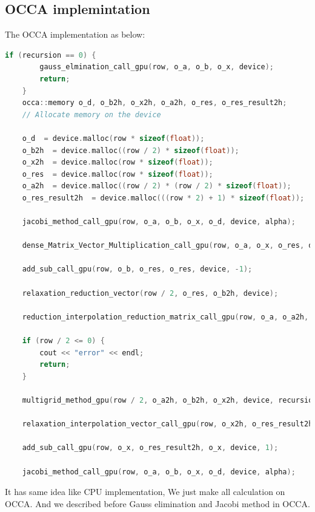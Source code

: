 \subsection{OCCA implemintation}
The OCCA implementation as below:\\
\begin{lstlisting}[language=C, caption=multigrid method in OCCA]
	if (recursion == 0) {
        gauss_elmination_call_gpu(row, o_a, o_b, o_x, device);
        return;
    }
    occa::memory o_d, o_b2h, o_x2h, o_a2h, o_res, o_res_result2h;
    // Allocate memory on the device

    o_d  = device.malloc(row * sizeof(float));
    o_b2h  = device.malloc((row / 2) * sizeof(float));
    o_x2h  = device.malloc(row * sizeof(float));
    o_res  = device.malloc(row * sizeof(float));
    o_a2h  = device.malloc((row / 2) * (row / 2) * sizeof(float));
    o_res_result2h  = device.malloc(((row * 2) + 1) * sizeof(float));

    jacobi_method_call_gpu(row, o_a, o_b, o_x, o_d, device, alpha);

    dense_Matrix_Vector_Multiplication_call_gpu(row, o_a, o_x, o_res, device);

    add_sub_call_gpu(row, o_b, o_res, o_res, device, -1);

    relaxation_reduction_vector(row / 2, o_res, o_b2h, device);

    reduction_interpolation_reduction_matrix_call_gpu(row, o_a, o_a2h, device);

    if (row / 2 <= 0) {
        cout << "error" << endl;
        return;
    }

    multigrid_method_gpu(row / 2, o_a2h, o_b2h, o_x2h, device, recursion - 1, alpha);

    relaxation_interpolation_vector_call_gpu(row, o_x2h, o_res_result2h, device);

    add_sub_call_gpu(row, o_x, o_res_result2h, o_x, device, 1);

    jacobi_method_call_gpu(row, o_a, o_b, o_x, o_d, device, alpha);
\end{lstlisting}

It has same idea like CPU implementation, We just make all calculation on OCCA. And we described before Gauss elimination and Jacobi method in OCCA. 

